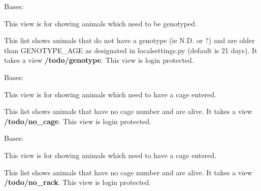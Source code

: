 \documentclass[letterpaper,10pt,english]{sphinxmanual}
\begin{document}

\begin{fulllineitems}
\label{api:mousedb.animal.views.GenotypeList}
Bases: {\hyperref[api:mousedb.animal.views.AnimalList]{}}

This view is for showing animals which need to be genotyped.

This list shows animals that do not have a genotype (ie N.D. or ?) and are older than GENOTYPE\_AGE as designated in localsettings.py (default is 21 days).
It takes a view \textbf{/todo/genotype}.
This view is login protected.

\end{fulllineitems}



\begin{fulllineitems}
\label{api:mousedb.animal.views.NoCageList}
Bases: {\hyperref[api:mousedb.animal.views.AnimalList]{}}

This view is for showing animals which need to have a cage entered.

This list shows animals that have no cage number and are alive.
It takes a view \textbf{/todo/no\_cage}.
This view is login protected.

\end{fulllineitems}



\begin{fulllineitems}
\label{api:mousedb.animal.views.NoRackList}
Bases: {\hyperref[api:mousedb.animal.views.AnimalList]{}}

This view is for showing animals which need to have a cage entered.

This list shows animals that have no cage number and are alive.
It takes a view \textbf{/todo/no\_rack}.
This view is login protected.

\end{fulllineitems}
\end{document}
